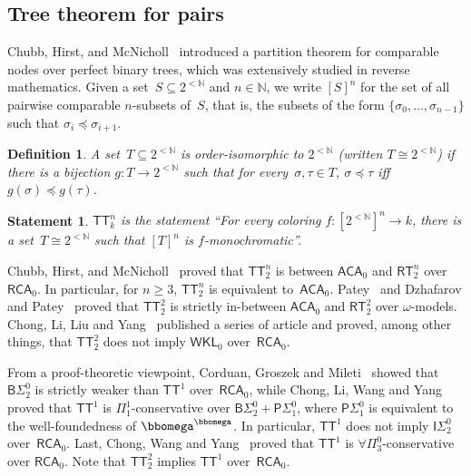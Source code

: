 \documentclass{article}
\numberwithin{theorem}{section}
\newtheorem{statement}[theorem]{Statement}
\newtheorem{definition}[theorem]{Definition}
\newcommand{\RCA}{\mathsf{RCA}}
\newcommand{\WKL}{\mathsf{WKL}}
\newcommand{\ACA}{\mathsf{ACA}}
\newcommand{\TT}{\mathsf{TT}}
\newcommand{\BSig}{\mathsf{B}\Sigma^0}
\newcommand{\ISig}{\mathsf{I}\Sigma^0}
\newcommand{\RT}{\mathsf{RT}}
\newcommand{\NN}{\mathbb{N}}
\newcommand{\bstr}{2^{<\NN}}
\def\qt#1{``#1''}%
\begin{document}
\subsection{Tree theorem for pairs}

Chubb, Hirst, and McNicholl~\cite{chubb2009reverse} introduced a partition theorem for comparable nodes over perfect binary trees, which was extensively studied in reverse mathematics. Given a set~$S \subseteq 2^{<\NN}$ and $n \in \NN$, we write $[S]^n$ for the set of all pairwise comparable $n$-subsets of~$S$, that is, the subsets of the form $\{\sigma_0, \dots, \sigma_{n-1} \}$ such that $\sigma_i \preceq \sigma_{i+1}$.

\begin{definition}
A set~$T \subseteq \bstr$ is \emph{order-isomorphic to $\bstr$} (written $T \cong \bstr$) if there is a bijection $g : T \to \bstr$ such that for every~$\sigma, \tau \in T$, $\sigma \preceq \tau$ iff $g(\sigma) \preceq g(\tau)$.
\end{definition}

\begin{statement}
$\TT^n_k$ is the statement \qt{For every coloring $f : [\bstr]^n \to k$, there is a set~$T \cong \bstr$ such that $[T]^n$ is $f$-monochromatic}. 
\end{statement}

Chubb, Hirst, and McNicholl~\cite{chubb2009reverse} proved that $\TT^n_2$ is between $\ACA_0$ and $\RT^n_2$ over~$\RCA_0$. In particular, for $n \geq 3$, $\TT^n_2$ is equivalent to~$\ACA_0$. Patey~\cite{patey2016strength} and Dzhafarov and Patey~\cite{dzhafarov2017coloring} proved that $\TT^2_2$ is strictly in-between $\ACA_0$ and $\RT^2_2$ over $\omega$-models. Chong, Li, Liu and Yang~\cite{chongStrengthRamseyTheorem2019a,chongStrengthRamseyTheorem2019b,chongStrengthRamseyTheorem2019c} published a series of article and proved, among other things, that $\TT^2_2$ does not imply $\WKL_0$ over~$\RCA_0$. 

From a proof-theoretic viewpoint, Corduan, Groszek and Mileti~\cite{corduan2010reverse} showed that $\BSig_2$ is strictly weaker than $\TT^1$ over~$\RCA_0$, while Chong, Li, Wang and Yang~\cite{chong2020strength} proved that $\TT^1$ is $\Pi^1_1$-conservative over $\BSig_2 + \mathsf{P}\Sigma^0_1$, where $\mathsf{P}\Sigma^0_1$ is equivalent to the well-foundedness of $\bbomega^{\bbomega}$. In particular, $\TT^1$ does not imply $\ISig_2$ over~$\RCA_0$.
Last, Chong, Wang and Yang~\cite{chong2023conservation} proved that $\TT^1$ is $\forall \Pi^0_3$-conservative over $\RCA_0$. Note that $\TT^2_2$ implies $\TT^1$ over~$\RCA_0$.
\end{document}
